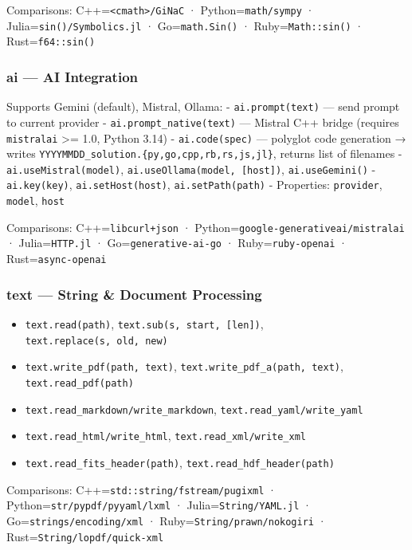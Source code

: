 \documentclass[
]{article}
\providecommand{\tightlist}{%
  \setlength{\itemsep}{0pt}\setlength{\parskip}{0pt}}
\begin{document}
Comparisons: C++=\texttt{\textless{}cmath\textgreater{}/GiNaC} ·
Python=\texttt{math/sympy} · Julia=\texttt{sin()/Symbolics.jl} ·
Go=\texttt{math.Sin()} · Ruby=\texttt{Math::sin()} ·
Rust=\texttt{f64::sin()}

\subsubsection{ai --- AI Integration}\label{ai-ai-integration}

Supports Gemini (default), Mistral, Ollama: - \texttt{ai.prompt(text)}
--- send prompt to current provider - \texttt{ai.prompt\_native(text)}
--- Mistral C++ bridge (requires \texttt{mistralai} \textgreater= 1.0,
Python 3.14) - \texttt{ai.code(spec)} --- polyglot code generation →
writes \texttt{YYYYMMDD\_solution.\{py,go,cpp,rb,rs,js,jl\}}, returns
list of filenames - \texttt{ai.useMistral(model)},
\texttt{ai.useOllama(model,\ {[}host{]})}, \texttt{ai.useGemini()} -
\texttt{ai.key(key)}, \texttt{ai.setHost(host)},
\texttt{ai.setPath(path)} - Properties: \texttt{provider},
\texttt{model}, \texttt{host}

Comparisons: C++=\texttt{libcurl+json} ·
Python=\texttt{google-generativeai/mistralai} · Julia=\texttt{HTTP.jl} ·
Go=\texttt{generative-ai-go} · Ruby=\texttt{ruby-openai} ·
Rust=\texttt{async-openai}

\subsubsection{text --- String \& Document
Processing}\label{text-string-document-processing}

\begin{itemize}
\tightlist
\item
  \texttt{text.read(path)}, \texttt{text.sub(s,\ start,\ {[}len{]})},
  \texttt{text.replace(s,\ old,\ new)}
\item
  \texttt{text.write\_pdf(path,\ text)},
  \texttt{text.write\_pdf\_a(path,\ text)},
  \texttt{text.read\_pdf(path)}
\item
  \texttt{text.read\_markdown/write\_markdown},
  \texttt{text.read\_yaml/write\_yaml}
\item
  \texttt{text.read\_html/write\_html},
  \texttt{text.read\_xml/write\_xml}
\item
  \texttt{text.read\_fits\_header(path)},
  \texttt{text.read\_hdf\_header(path)}
\end{itemize}

Comparisons: C++=\texttt{std::string/fstream/pugixml} ·
Python=\texttt{str/pypdf/pyyaml/lxml} · Julia=\texttt{String/YAML.jl} ·
Go=\texttt{strings/encoding/xml} · Ruby=\texttt{String/prawn/nokogiri} ·
Rust=\texttt{String/lopdf/quick-xml}
\end{document}
